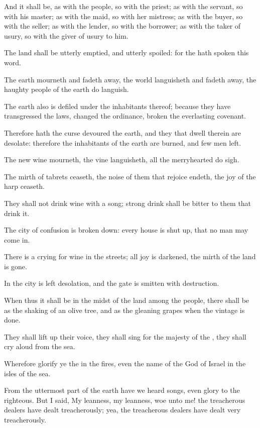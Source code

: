 \verse And it shall be, as with the people, so with the priest; as with the servant, so with his master; as with the maid, so with her mistress; as with the buyer, so with the seller; as with the lender, so with the borrower; as with the taker of usury, so with the giver of usury to him.

\verse The land shall be utterly emptied, and utterly spoiled: for the \LORD hath spoken this word.

\verse The earth mourneth and fadeth away, the world languisheth and fadeth away, the haughty people of the earth do languish.

\verse The earth also is defiled under the inhabitants thereof; because they have transgressed the laws, changed the ordinance, broken the everlasting covenant.

\verse Therefore hath the curse devoured the earth, and they that dwell therein are desolate: therefore the inhabitants of the earth are burned, and few men left.

\verse The new wine mourneth, the vine languisheth, all the merryhearted do sigh.

\verse The mirth of tabrets ceaseth, the noise of them that rejoice endeth, the joy of the harp ceaseth.

\verse They shall not drink wine with a song; strong drink shall be bitter to them that drink it.

\verse The city of confusion is broken down: every house is shut up, that no man may come in.

\verse There is a crying for wine in the streets; all joy is darkened, the mirth of the land is gone.

\verse In the city is left desolation, and the gate is smitten with destruction.

\verse When thus it shall be in the midst of the land among the people, there shall be as the shaking of an olive tree, and as the gleaning grapes when the vintage is done.

\verse They shall lift up their voice, they shall sing for the majesty of the \LORD, they shall cry aloud from the sea.

\verse Wherefore glorify ye the \LORD in the fires, even the name of the \LORD God of Israel in the isles of the sea.

\verse From the uttermost part of the earth have we heard songs, even glory to the righteous. But I said, My leanness, my leanness, woe unto me! the treacherous dealers have dealt treacherously; yea, the treacherous dealers have dealt very treacherously.

